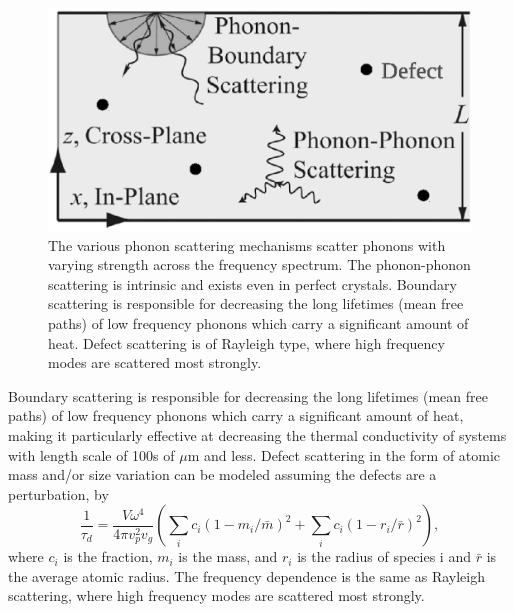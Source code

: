 \documentclass[letterpaper,12pt]{article}
\begin{document}
\begin{figure}
\begin{center}
\includegraphics[scale=0.25]{phonon_scattering_diagram.eps}
\vspace*{-5mm}
\end{center}
\caption{\label{FIG:phonon_scattering_diag} The various phonon scattering mechanisms scatter phonons with varying strength across the frequency spectrum. The phonon-phonon scattering is intrinsic and exists even in perfect crystals. Boundary scattering is responsible for decreasing the long lifetimes (mean free paths) of low frequency phonons which carry a significant amount of heat. Defect scattering is of Rayleigh type, where high frequency modes are scattered most strongly.}
\end{figure}
Boundary scattering is responsible for decreasing the long lifetimes (mean free paths) of low frequency phonons which carry a significant amount of heat, making it particularly effective at decreasing the thermal conductivity of systems with length scale of 100s of $\mu$m and less.\cite{mcgaughey:061911}
Defect scattering in the form of atomic mass and/or size variation can be modeled assuming the defects are a perturbation, by
\begin{equation}\label{EQ:M:tau_d}
\frac{1}{\tau_{d}} = \frac{V \omega^4}{4 \pi v_p^2 v_g} ( \sum_i c_i(1-m_i/\bar m)^2 + \sum_i c_i(1-r_i/\bar r)^2 ),
\end{equation}
where $c_i$ is the fraction, $m_i$ is the mass, and $r_i$ is the radius of species i and $\bar r$ is the average atomic radius.\cite{klemens1955,klemens1957} The frequency dependence is the same as Rayleigh scattering, where high frequency modes are scattered most strongly. 
\end{document}
